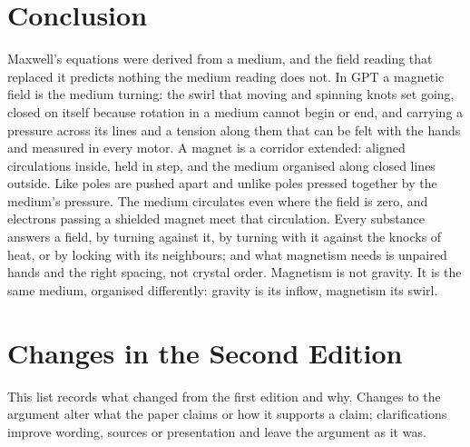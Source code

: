 \documentclass[11pt,a4paper]{article}
\begin{document}
\section*{Conclusion}

Maxwell's equations were derived from a medium, and the field reading that replaced it predicts nothing the medium reading does not. In GPT a magnetic field is the medium turning: the swirl that moving and spinning knots set going, closed on itself because rotation in a medium cannot begin or end, and carrying a pressure across its lines and a tension along them that can be felt with the hands and measured in every motor. A magnet is a corridor extended: aligned circulations inside, held in step, and the medium organised along closed lines outside. Like poles are pushed apart and unlike poles pressed together by the medium's pressure. The medium circulates even where the field is zero, and electrons passing a shielded magnet meet that circulation. Every substance answers a field, by turning against it, by turning with it against the knocks of heat, or by locking with its neighbours; and what magnetism needs is unpaired hands and the right spacing, not crystal order. Magnetism is not gravity. It is the same medium, organised differently: gravity is its inflow, magnetism its swirl.

\clearpage
\section*{Changes in the Second Edition}

This list records what changed from the first edition and why. Changes to the argument alter what the paper claims or how it supports a claim; clarifications improve wording, sources or presentation and leave the argument as it was.
\end{document}
